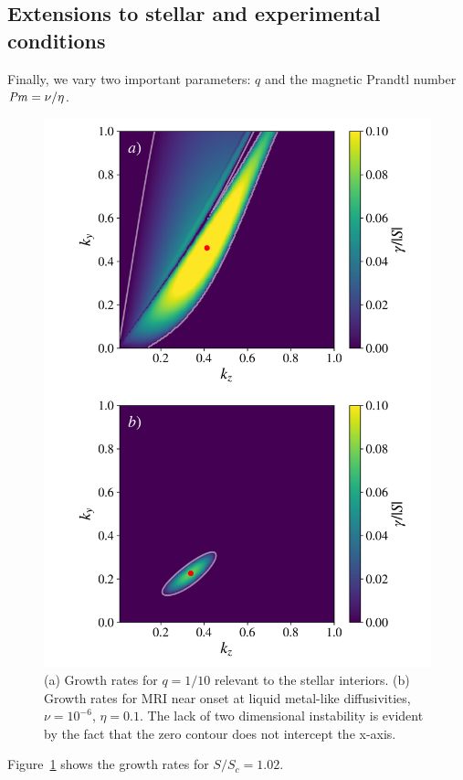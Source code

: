 \documentclass[openacc]{rsproca_new}%
\newcommand{\SSC}{S/S_{c}}
\newcommand{\Prm}{\mbox{\textit{Pm}}}
\begin{document}
\subsection{Extensions to stellar and experimental conditions}
\label{sec:extensions}

Finally, we vary two important parameters:
$q$ and the magnetic Prandtl number $\Prm=\nu/\eta$.
\begin{figure}[h!]
  \centering
  \includegraphics[width=\columnwidth]{low_rossby_liquid_metal_growth_rates.pdf}
  \caption{(a) Growth rates for $q=1/10$ relevant to the stellar interiors. 
  (b) Growth rates for MRI near onset at liquid metal-like diffusivities, $\nu=10^{-6}$, $\eta=0.1$.
The lack of two dimensional instability is evident by the fact that the zero contour does not intercept the x-axis.}
  \label{fig:other_params}
\end{figure}
Figure~\ref{fig:other_params} shows the growth rates for $\SSC=1.02$.
\end{document}
